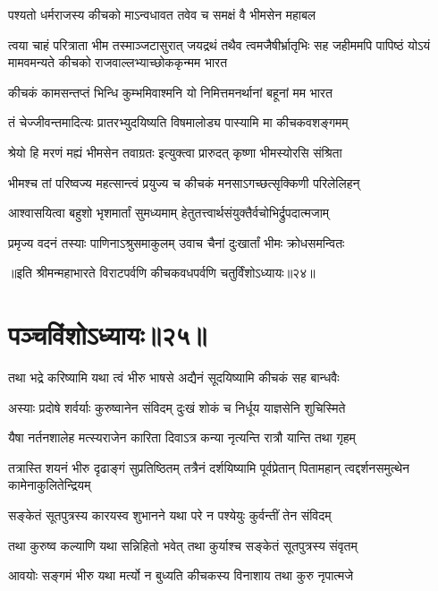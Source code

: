\twolineshloka
{पश्यतो धर्मराजस्य कीचको माऽन्वधावत}
{तवेव च समक्षं वै भीमसेन महाबल}


\onelineshloka
{त्वया चाहं परित्राता भीम तस्माञ्जटासुरात्}
\threelineshloka
{जयद्रथं तथैव त्वमजैषीर्भ्रातृभिः सह}
{जहीममपि पापिष्ठं योऽयं मामवमन्यते}
{कीचको राजवाल्लभ्याच्छोककृन्मम भारत}


\twolineshloka
{कीचकं कामसन्तप्तं भिन्धि कुम्भमिवाश्मनि}
{यो निमित्तमनर्थानां बहूनां मम भारत}


\twolineshloka
{तं चेज्जीवन्तमादित्यः प्रातरभ्युदयिष्यति}
{विषमालोड्य पास्यामि मा कीचकवशङ्गमम्}


\twolineshloka
{श्रेयो हि मरणं मह्यं भीमसेन तवाग्रतः}
{इत्युक्त्वा प्रारुदत् कृष्णा भीमस्योरसि संश्रिता}


\twolineshloka
{भीमश्च तां परिष्वज्य महत्सान्त्वं प्रयुज्य च}
{कीचकं मनसाऽगच्छत्सृक्किणी परिलेलिहन्}


\twolineshloka
{आश्वासयित्वा बहुशो भृशमार्तां सुमध्यमाम्}
{हेतुतत्त्वार्थसंयुक्तैर्वचोभिर्द्रुपदात्मजाम्}


\twolineshloka
{प्रमृज्य वदनं तस्याः पाणिनाऽश्रुसमाकुलम्}
{उवाच चैनां दुःखार्तां भीमः क्रोधसमन्वितः}

॥इति श्रीमन्महाभारते विराटपर्वणि कीचकवधपर्वणि चतुर्विंशोऽध्यायः॥२४॥

\chapter{पञ्चविंशोऽध्यायः॥२५॥}

\twolineshloka
{तथा भद्रे करिष्यामि यथा त्वं भीरु भाषसे}
{अद्यैनं सूदयिष्यामि कीचकं सह बान्धवैः}


\twolineshloka
{अस्याः प्रदोषे शर्वर्याः कुरुष्वानेन संविदम्}
{दुःखं शोकं च निर्धूय याज्ञसेनि शुचिस्मिते}


\twolineshloka
{यैषा नर्तनशालेह मत्स्यराजेन कारिता}
{दिवाऽत्र कन्या नृत्यन्ति रात्रौ यान्ति तथा गृहम्}


\threelineshloka
{तत्रास्ति शयनं भीरु दृढाङ्गं सुप्रतिष्ठितम्}
{तत्रैनं दर्शयिष्यामि पूर्वप्रेतान् पितामहान्}
{त्वद्दर्शनसमुत्थेन कामेनाकुलितेन्द्रियम्}


\twolineshloka
{सङ्केतं सूतपुत्रस्य कारयस्व शुभानने}
{यथा परे न पश्येयुः कुर्वन्तीं तेन संविदम्}


\twolineshloka
{तथा कुरुष्व कल्याणि यथा सन्निहितो भवेत्}
{तथा कुर्याश्च सङ्केतं सूतपुत्रस्य संवृतम्}


\twolineshloka
{आवयोः सङ्गमं भीरु यथा मर्त्यो न बुध्यति}
{कीचकस्य विनाशाय तथा कुरु नृपात्मजे}


